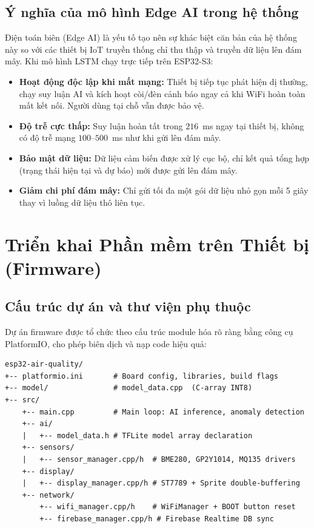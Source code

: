\documentclass[12pt,a4paper]{article}
\begin{document}
\subsection{Ý nghĩa của mô hình Edge AI trong hệ thống}

Điện toán biên (Edge AI) là yếu tố tạo nên sự khác biệt căn bản của hệ thống này so với các thiết bị IoT truyền thống chỉ thu thập và truyền dữ liệu lên đám mây. Khi mô hình LSTM chạy trực tiếp trên ESP32-S3:

\begin{itemize}
    \item \textbf{Hoạt động độc lập khi mất mạng:} Thiết bị tiếp tục phát hiện dị thường, chạy suy luận AI và kích hoạt còi/đèn cảnh báo ngay cả khi WiFi hoàn toàn mất kết nối. Người dùng tại chỗ vẫn được bảo vệ.
    \item \textbf{Độ trễ cực thấp:} Suy luận hoàn tất trong $216$~ms ngay tại thiết bị, không có độ trễ mạng $100$--$500$~ms như khi gửi lên đám mây.
    \item \textbf{Bảo mật dữ liệu:} Dữ liệu cảm biến được xử lý cục bộ, chỉ kết quả tổng hợp (trạng thái hiện tại và dự báo) mới được gửi lên đám mây.
    \item \textbf{Giảm chi phí đám mây:} Chỉ gửi tối đa một gói dữ liệu nhỏ gọn mỗi 5 giây thay vì luồng dữ liệu thô liên tục.
\end{itemize}

\newpage

\section{Triển khai Phần mềm trên Thiết bị (Firmware)}

\subsection{Cấu trúc dự án và thư viện phụ thuộc}

Dự án firmware được tổ chức theo cấu trúc module hóa rõ ràng bằng công cụ PlatformIO, cho phép biên dịch và nạp code hiệu quả:

\begin{lstlisting}[caption={Cấu trúc thư mục dự án firmware (PlatformIO)}, language={}]
esp32-air-quality/
+-- platformio.ini       # Board config, libraries, build flags
+-- model/               # model_data.cpp  (C-array INT8)
+-- src/
    +-- main.cpp         # Main loop: AI inference, anomaly detection
    +-- ai/
    |   +-- model_data.h # TFLite model array declaration
    +-- sensors/
    |   +-- sensor_manager.cpp/h  # BME280, GP2Y1014, MQ135 drivers
    +-- display/
    |   +-- display_manager.cpp/h # ST7789 + Sprite double-buffering
    +-- network/
        +-- wifi_manager.cpp/h    # WiFiManager + BOOT button reset
        +-- firebase_manager.cpp/h # Firebase Realtime DB sync
\end{lstlisting}
\end{document}
